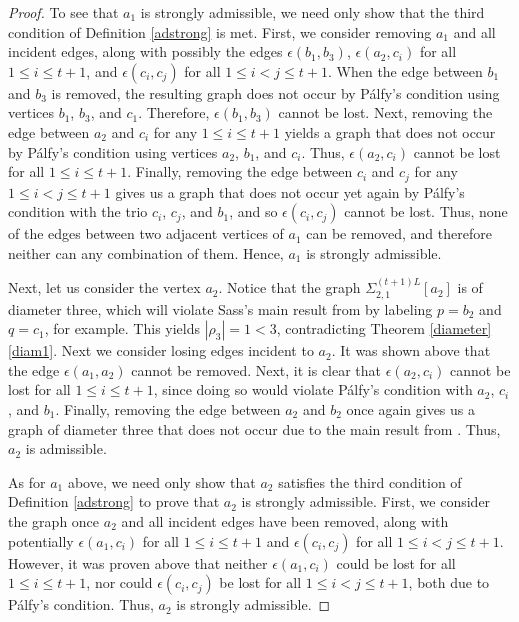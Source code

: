 \documentclass[11pt]{amsart}
\theoremstyle{definition}
\theoremstyle{remark}
\numberwithin{equation}{section}
\newcommand{\SLi}[3]{\Sigma_{#1,#2}^{#3L}} %
\begin{document}
\begin{proof}
To see that $a_1$ is strongly admissible, we need only show that the third condition of Definition \ref{adstrong} is met. First, we consider removing $a_1$ and all incident edges, along with possibly the edges $\epsilon(b_1,b_3)$, $\epsilon(a_2,c_i)$ for all $1\leq i\leq t+1$, and $\epsilon(c_i,c_j)$ for all $1\leq i<j\leq t+1$. When the edge between $b_1$ and $b_3$ is removed, the resulting graph does not occur by P\'alfy's condition using vertices $b_1$, $b_3$, and $c_1$. Therefore, $\epsilon(b_1,b_3)$ cannot be lost. Next, removing the edge between $a_2$ and $c_i$ for any $1\leq i\leq t+1$ yields a graph that does not occur by P\'alfy's condition using vertices $a_2$, $b_1$, and $c_i$. Thus, $\epsilon(a_2,c_i)$ cannot be lost for all $1\leq i\leq t+1$. Finally, removing the edge between $c_i$ and $c_j$ for any $1\leq i<j\leq t+1$ gives us a graph that does not occur yet again by P\'alfy's condition with the trio $c_i$, $c_j$, and $b_1$, and so $\epsilon(c_i,c_j)$ cannot be lost. Thus, none of the edges between two adjacent vertices of $a_1$ can be removed, and therefore neither can any combination of them. Hence, $a_1$ is strongly admissible.

Next, let us consider the vertex $a_2$. Notice that the graph $\SLi{2}{1}{(t+1)}[a_2]$ is of diameter three, which will violate Sass's main result from \cite{S} by labeling $p=b_2$ and $q=c_1$, for example. This yields $|\rho_3|=1<3$, contradicting Theorem \ref{diameter}\eqref{diam1}. Next we consider losing edges incident to $a_2$. It was shown above that the edge $\epsilon(a_1,a_2)$ cannot be removed. Next, it is clear that $\epsilon(a_2,c_i)$ cannot be lost for all $1\leq i\leq t+1$, since doing so would violate P\'alfy's condition with $a_2$, $c_i$, and $b_1$. Finally, removing the edge between $a_2$ and $b_2$ once again gives us a graph of diameter three that does not occur due to the main result from \cite{S}. Thus, $a_2$ is admissible.

As for $a_1$ above, we need only show that $a_2$ satisfies the third condition of Definition \ref{adstrong} to prove that $a_2$ is strongly admissible. First, we consider the graph once $a_2$ and all incident edges have been removed, along with potentially $\epsilon(a_1,c_i)$ for all $1\leq i\leq t+1$ and $\epsilon(c_i,c_j)$ for all $1\leq i<j\leq t+1$. However, it was proven above that neither $\epsilon(a_1,c_i)$ could be lost for all $1\leq i\leq t+1$, nor could $\epsilon(c_i,c_j)$ be lost for all $1\leq i<j\leq t+1$, both due to P\'alfy's condition. Thus, $a_2$ is strongly admissible.


\end{proof}
\end{document}
